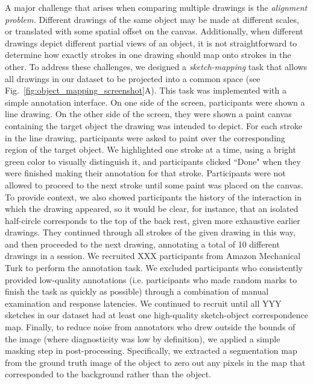 \documentclass[11pt,letterpaper]{article}
\begin{document}
A major challenge that arises when comparing multiple drawings is the \emph{alignment problem.} 
Different drawings of the same object may be made at different scales, or translated with some spatial offset on the canvas.
Additionally, when different drawings depict different partial views of an object, it is not straightforward to determine how exactly strokes in one drawing should map onto strokes in the other.
To address these challenges, we designed a \emph{sketch-mapping} task that allows all drawings in our dataset to be projected into a common space (see Fig.~\ref{fig:object_mapping_screenshot}A).
This task was implemented with a simple annotation interface.
On one side of the screen, participants were shown a line drawing.
On the other side of the screen, they were shown a paint canvas containing the target object the drawing was intended to depict.
For each stroke in the line drawing, participants were asked to paint over the corresponding region of the target object.
We highlighted one stroke at a time, using a bright green color to visually distinguish it, and participants clicked ``Done" when they were finished making their annotation for that stroke.
Participants were not allowed to proceed to the next stroke until some paint was placed on the canvas.
To provide context, we also showed participants the history of the interaction in which the drawing appeared, so it would be clear, for instance, that an isolated half-circle corresponds to the top of the back rest, given more exhaustive earlier drawings.
They continued through all strokes of the given drawing in this way, and then proceeded to the next drawing, annotating a total of 10 different drawings in a session.
We recruited XXX participants from Amazon Mechanical Turk to perform the annotation task.
We excluded participants who consistently provided low-quality annotations (i.e. participants who made random marks to finish the task as quickly as possible) through a combination of manual examination and response latencies.
We continued to recruit until all YYY sketches in our dataset had at least one high-quality sketch-object correspondence map.
Finally, to reduce noise from annotators who drew outside the bounds of the image (where diagnosticity was low by definition), we applied a simple masking step in post-processing.
Specifically, we extracted a segmentation map from the ground truth image of the object to zero out any pixels in the map that corresponded to the background rather than the object.
\end{document}
